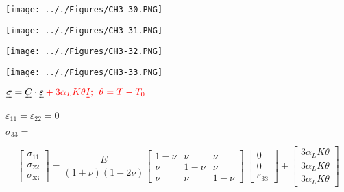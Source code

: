 \documentclass[onecolumn,11pt]{report}
\def\lthtmlcheckvsize{\ifdim\ht\sizebox<\vsize 
  \ifdim\wd\sizebox<\hsize\expandafter\hfill\fi \expandafter\vfill
  \else\expandafter\vss\fi}%
\begin{document}
{\newpage\clearpage
{}%
\texttt{[image: .././Figures/CH3-30.PNG]}%
\lthtmlpictureZ
\lthtmlcheckvsize\clearpage}

{\newpage\clearpage
{}%
\texttt{[image: .././Figures/CH3-31.PNG]}%
\lthtmlpictureZ
\lthtmlcheckvsize\clearpage}

{\newpage\clearpage
{}%
\texttt{[image: .././Figures/CH3-32.PNG]}%
\lthtmlpictureZ
\lthtmlcheckvsize\clearpage}

{\newpage\clearpage
{}%
\texttt{[image: .././Figures/CH3-33.PNG]}%
\lthtmlpictureZ
\lthtmlcheckvsize\clearpage}

{\newpage\clearpage
{}%
$\displaystyle \uuline{\sigma} = \uuline{C} \cdot \uuline{\varepsilon} \color{red} + 3 \alpha_L K \theta \uuline{I}; \:\: \theta = T - T_0$%
\lthtmlindisplaymathZ
\lthtmlcheckvsize\clearpage}

{\newpage\clearpage
{}%
$ \varepsilon_{11} = \varepsilon_{22} = 0$%
\lthtmlindisplaymathZ
\lthtmlcheckvsize\clearpage}

{\newpage\clearpage
{}%
$ \sigma_{33} = $%
\lthtmlindisplaymathZ
\lthtmlcheckvsize\clearpage}

{\newpage\clearpage
{}%
\begin{displaymath}%
	\left[
\begin{array} {c}
\sigma_{11} \\
\sigma_{22} \\
\sigma_{33}
\end{array}
\right]
=
\frac{E}{(1+\nu)(1-2\nu)}
\left[
\begin{array}{ccc}
1-\nu & \nu & \nu \\
\nu & 1-\nu & \nu \\
\nu & \nu & 1-\nu
\end{array}
\right]
\:
\left[
\begin{array} {c}
0 \\
0 \\
\varepsilon_{33}
\end{array}
\right]
+
\left[
\begin{array} {c}
3 \alpha_L K \theta \\
3 \alpha_L K \theta \\
3 \alpha_L K \theta
\end{array}
\right]\end{displaymath}%
\lthtmldisplayZ
\lthtmlcheckvsize\clearpage}
\end{document}
